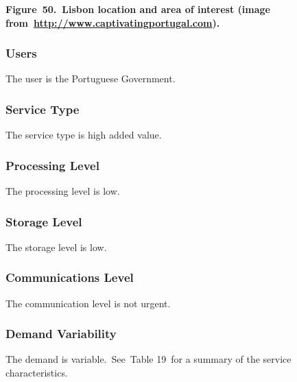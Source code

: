 \documentclass[a4paper]{article}
\begin{document}
{\centering\bfseries
\label{bkm:Ref377555320}Figure\ 50.\ Lisbon location and area of
interest (image
from\ \href{http://www.captivatingportugal.com/}{http://www.captivatingportugal.com}).
\par}


\bigskip

\subsubsection[Users]{ Users}
\hypertarget{Toc381777276}{}{
The user is the Portuguese Government.}

\subsubsection[Service Type]{ Service Type}
\hypertarget{Toc381777277}{}{
The service type is high added value.}

\subsubsection[Processing Level]{ Processing
Level}
\hypertarget{Toc381777278}{}{
The processing level is low.}

\subsubsection[Storage Level]{ Storage Level}
\hypertarget{Toc381777279}{}{
The storage level is low.}

\subsubsection[Communications Level]{
Communications Level}
\hypertarget{Toc381777280}{}{
The communication level is not urgent.}

\subsubsection[Demand Variability]{ Demand
Variability}
\hypertarget{Toc381777281}{}The demand is
variable.\ \foreignlanguage{english}{See\ }Table
19\foreignlanguage{english}{\ for a summary of the service
characteristics.}


\bigskip
\end{document}

